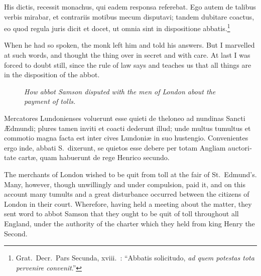 \documentclass{book}
\newcommand{\blockhead}[4][]{
\begin{figure}
\centering
\vspace{#4}
\parbox{2.75cm}{\begin{center}\footnotesize \color{BrickRed} \emph{#2}\\ #1 \end{center}}
\end{figure}
}
\begin{document}
\begin{paracol}{2}
\switchcolumn*

\begin{otherlanguage}{latin}
His dictis, recessit monachus, qui eadem responsa referebat. Ego autem de talibus verbis mirabar, et contrariis motibus mecum disputavi; tandem dubitare coactus, eo quod regula juris dicit et docet, ut omnia sint in dispositione abbatis.\footnote[\textdagger]{Grat.\ Decr.\ Pars Secunda, xviii.\ : ``Abbatis solicitudo, \emph{ad quem potestas tota pervenire convenit}.''}
\end{otherlanguage}

\switchcolumn

When he had so spoken, the monk left him and told his answers. But I marvelled at such words, and thought the thing over in secret and with care. At last I was forced to doubt still, since the rule of law says and teaches us that all things are in the disposition of the abbot.

\switchcolumn*

\begin{otherlanguage}{latin}
\blockhead{How abbot Samson disputed with the men of London about the payment of tolls.}{4}{-.65cm}
Mercatores Lundonienses voluerunt esse quieti de theloneo ad nundinas Sancti \AE{}dmundi; plures tamen inviti et coacti dederunt illud; unde multus tumultus et commotio magna facta est inter cives Lundoni\ae{} in suo hustengio. Convenientes ergo inde, abbati S.\ dixerunt, se quietos esse debere per totam Angliam auctoritate cart\ae{}, quam habuerunt de rege Henrico secundo.

\end{otherlanguage}

\switchcolumn

The merchants of London wished to be quit from toll at the fair of St.\ Edmund's. Many, however, though unwillingly and under compulsion, paid it, and on this account many tumults and a great disturbance occurred between the citizens of London in their court. Wherefore, having held a meeting about the matter, they sent word to abbot Samson that they ought to be quit of toll throughout all England, under the authority of the charter which they held from king Henry the Second.

\switchcolumn*


\end{paracol}
\end{document}
